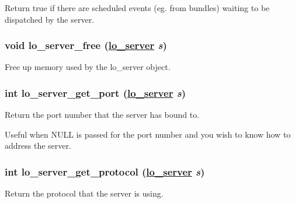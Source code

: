 Return true if there are scheduled events (eg. from bundles) waiting to be dispatched by the server. 

\hypertarget{group__liblolowlevel_gd3dc9193e1eef0d71a4b046242b64216}{
\subsubsection[lo\_\-server\_\-free]{\setlength{\rightskip}{0pt plus 5cm}void lo\_\-server\_\-free (\hyperlink{lo__types_8h_59067bf50cf8abb4371da6f03c9036c9}{lo\_\-server} {\em s})}}
\label{group__liblolowlevel_gd3dc9193e1eef0d71a4b046242b64216}


Free up memory used by the lo\_\-server object. 

\hypertarget{group__liblolowlevel_g532ef6e1b8675b23e65dd19eeb648c1d}{
\subsubsection[lo\_\-server\_\-get\_\-port]{\setlength{\rightskip}{0pt plus 5cm}int lo\_\-server\_\-get\_\-port (\hyperlink{lo__types_8h_59067bf50cf8abb4371da6f03c9036c9}{lo\_\-server} {\em s})}}
\label{group__liblolowlevel_g532ef6e1b8675b23e65dd19eeb648c1d}


Return the port number that the server has bound to. 

Useful when NULL is passed for the port number and you wish to know how to address the server. \hypertarget{group__liblolowlevel_gb40a599fe8440512b18479dac333e89f}{
\subsubsection[lo\_\-server\_\-get\_\-protocol]{\setlength{\rightskip}{0pt plus 5cm}int lo\_\-server\_\-get\_\-protocol (\hyperlink{lo__types_8h_59067bf50cf8abb4371da6f03c9036c9}{lo\_\-server} {\em s})}}
\label{group__liblolowlevel_gb40a599fe8440512b18479dac333e89f}


Return the protocol that the server is using. 


